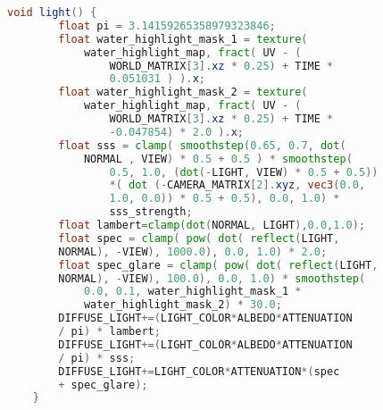 \begin{lstlisting}[language=GLSL, caption={\label{cf:agua} \textit{Shader} de efeito de água na Unity}]
	void light() {
		float pi = 3.14159265358979323846;
		float water_highlight_mask_1 = texture(
			water_highlight_map, fract( UV - (
				WORLD_MATRIX[3].xz * 0.25) + TIME * 
				0.051031 ) ).x;
		float water_highlight_mask_2 = texture(
			water_highlight_map, fract( UV - (
				WORLD_MATRIX[3].xz * 0.25) + TIME * 
				-0.047854) * 2.0 ).x;
		float sss = clamp( smoothstep(0.65, 0.7, dot(
			NORMAL , VIEW) * 0.5 + 0.5 ) * smoothstep(
				0.5, 1.0, (dot(-LIGHT, VIEW) * 0.5 + 0.5))
				*( dot (-CAMERA_MATRIX[2].xyz, vec3(0.0, 
				1.0, 0.0)) * 0.5 + 0.5), 0.0, 1.0) * 
				sss_strength;
		float lambert=clamp(dot(NORMAL, LIGHT),0.0,1.0);
		float spec = clamp( pow( dot( reflect(LIGHT, 
		NORMAL), -VIEW), 1000.0), 0.0, 1.0) * 2.0;
		float spec_glare = clamp( pow( dot( reflect(LIGHT, 
		NORMAL), -VIEW), 100.0), 0.0, 1.0) * smoothstep(
			0.0, 0.1, water_highlight_mask_1 * 
			water_highlight_mask_2) * 30.0;
		DIFFUSE_LIGHT+=(LIGHT_COLOR*ALBEDO*ATTENUATION 
		/ pi) * lambert;
		DIFFUSE_LIGHT+=(LIGHT_COLOR*ALBEDO*ATTENUATION 
		/ pi) * sss;
		DIFFUSE_LIGHT+=LIGHT_COLOR*ATTENUATION*(spec 
		+ spec_glare);
	}
\end{lstlisting}

\nocite{alin2021}

